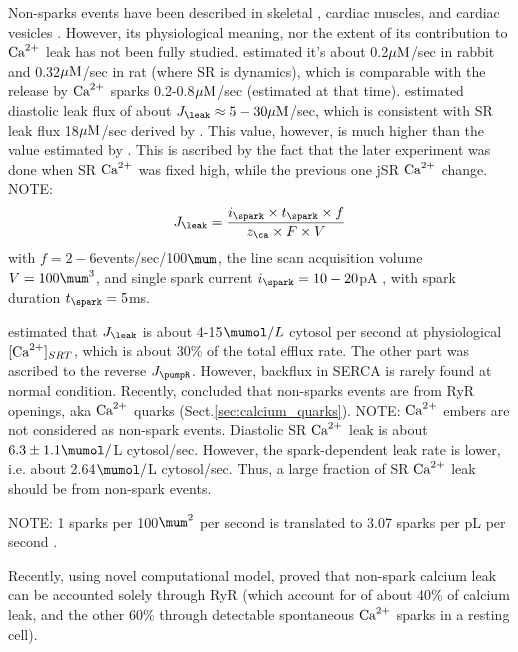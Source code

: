 Non-sparks events have been described in skeletal \citep{shirokova1997}, cardiac
\citep{lipp2002} muscles, and cardiac vesicles \citep{shannon2005}. However, its
physiological meaning, nor the extent of its contribution to ${\text{Ca}^{2+}}$ leak has not
been fully studied. \citep{bassani1995rdc} estimated it's about 0.2${\mu\text{M}}$/sec in
rabbit and 0.32${\mu\text{M}}$/sec in rat (where SR is dynamics), which is comparable
with the release by ${\text{Ca}^{2+}}$ sparks 0.2-0.8${\mu\text{M}}$/sec (estimated at that time).
\citep{lukyanenko2001} estimated diastolic leak flux of about $J_\leak \approx
5-30\muM$/sec, which is consistent with SR leak flux 18${\mu\text{M}}$/sec derived by
\citep{balke1994}. This value, however, is much higher than the value estimated
by \citep{bassani1995rdc}. This is ascribed by the fact that the later
experiment was done when SR ${\text{Ca}^{2+}}$ was fixed high, while the previous one jSR
${\text{Ca}^{2+}}$ change. NOTE:
\begin{equation}
J_\leak = \frac{i_\spark \times t_\spark \times f}{z_\ca \times F \times V}
\end{equation}
with $f=2-6$events/sec/100$\mum$, the line scan acquisition volume
$V=100\mum^3$, and single spark current $i_\spark=10-20$pA \citep{izu2001}, with
spark duration $t_\spark=5$ms.

\citep{shannon2002} estimated that $J_\leak$ is about 4-15$\mumol/L$ cytosol per
second at physiological $[{\text{Ca}^{2+}}]_{SRT}$, which is about 30\% of the total efflux
rate. The other part was ascribed to the reverse $J_\pumpR$. However, backflux
in SERCA is rarely found at normal condition. Recently, \citep{santiago2010}
concluded that non-sparks events are from RyR openings, aka ${\text{Ca}^{2+}}$ quarks
(Sect.\ref{sec:calcium_quarks}). NOTE: ${\text{Ca}^{2+}}$ embers are not considered as non-spark
events. Diastolic SR ${\text{Ca}^{2+}}$ leak is about $6.3\pm 1.1\mumol/$L cytosol/sec.
However, the spark-dependent leak rate is lower, i.e. about 2.64$\mumol/$L
cytosol/sec. Thus, a large fraction of SR ${\text{Ca}^{2+}}$ leak should be from non-spark
events.

\begin{framed}
NOTE: 1 sparks per 100$\mum^2$ per second is translated to 3.07 sparks per pL
per second \citep{santiago2010}.
\end{framed}

Recently, \citep{williams2011} using novel computational model, proved
that non-spark calcium leak can be accounted solely through RyR (which account
for of about 40\% of calcium leak, and the other 60\% through detectable
spontaneous ${\text{Ca}^{2+}}$ sparks in a resting cell).


